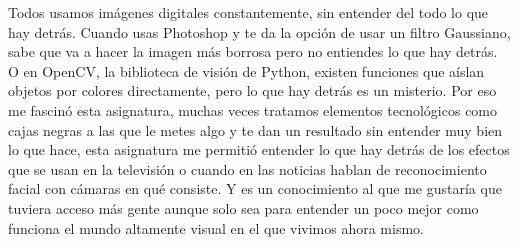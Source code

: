 Todos usamos imágenes digitales constantemente, sin entender del todo lo que hay detrás. Cuando usas Photoshop y te da la opción de usar un filtro Gaussiano, sabe que va a hacer la imagen más borrosa pero no entiendes lo que hay detrás. O en OpenCV, la biblioteca de visión de Python, existen funciones que aíslan objetos por colores directamente, pero lo que hay detrás es un misterio. Por eso me fascinó esta asignatura, muchas veces tratamos elementos tecnológicos como cajas negras a las que le metes algo y te dan un resultado sin entender muy bien lo que hace, esta asignatura me permitió entender lo que hay detrás de los efectos que se usan en la televisión o cuando en las noticias hablan de reconocimiento facial con cámaras en qué consiste. Y es un conocimiento al que me gustaría que tuviera acceso más gente aunque solo sea para entender un poco mejor como funciona el mundo altamente visual en el que vivimos ahora mismo.

